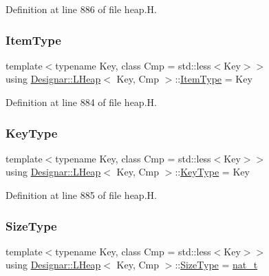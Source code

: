 Definition at line 886 of file heap.\+H.

\mbox{\label{class_designar_1_1_l_heap_abb88755259887662cd93045937b6a045}} 
\subsubsection{\texorpdfstring{Item\+Type}{ItemType}}
{\footnotesize\ttfamily template$<$typename Key, class Cmp = std\+::less$<$\+Key$>$$>$ \\
using \hyperlink{class_designar_1_1_l_heap}{Designar\+::\+L\+Heap}$<$ Key, Cmp $>$\+::\hyperlink{class_designar_1_1_l_heap_abb88755259887662cd93045937b6a045}{Item\+Type} =  Key}



Definition at line 884 of file heap.\+H.

\mbox{\label{class_designar_1_1_l_heap_a8d4160e7d11e74de54685fe905e30aa4}} 
\subsubsection{\texorpdfstring{Key\+Type}{KeyType}}
{\footnotesize\ttfamily template$<$typename Key, class Cmp = std\+::less$<$\+Key$>$$>$ \\
using \hyperlink{class_designar_1_1_l_heap}{Designar\+::\+L\+Heap}$<$ Key, Cmp $>$\+::\hyperlink{class_designar_1_1_l_heap_a8d4160e7d11e74de54685fe905e30aa4}{Key\+Type} =  Key}



Definition at line 885 of file heap.\+H.

\mbox{\label{class_designar_1_1_l_heap_a2220ce9a3ac8209fda43d10778943e91}} 
\subsubsection{\texorpdfstring{Size\+Type}{SizeType}}
{\footnotesize\ttfamily template$<$typename Key, class Cmp = std\+::less$<$\+Key$>$$>$ \\
using \hyperlink{class_designar_1_1_l_heap}{Designar\+::\+L\+Heap}$<$ Key, Cmp $>$\+::\hyperlink{class_designar_1_1_l_heap_a2220ce9a3ac8209fda43d10778943e91}{Size\+Type} =  \hyperlink{namespace_designar_aa72662848b9f4815e7bf31a7cf3e33d1}{nat\+\_\+t}}



